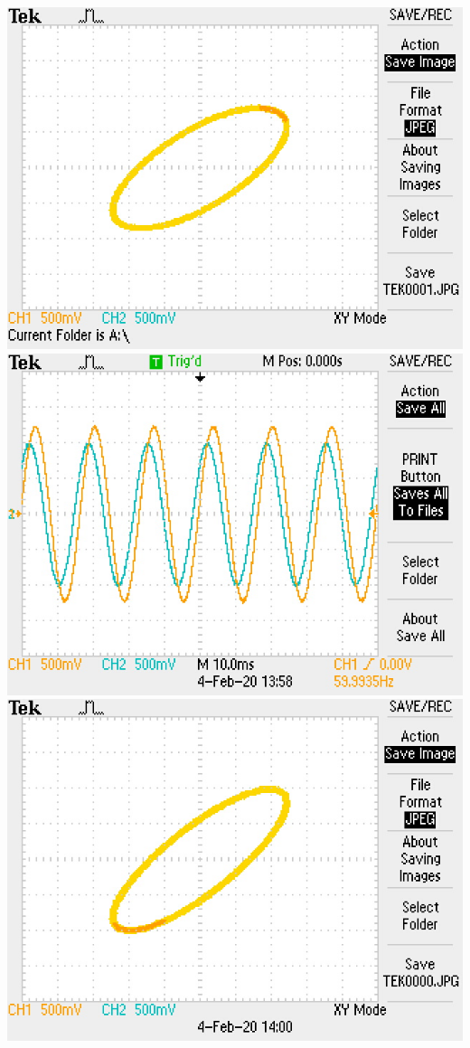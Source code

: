 \includegraphics[width=\textwidth/2]{1-lab/res/4b.JPG}\\
\includegraphics[width=\textwidth/2]{1-lab/res/5a.JPG}
\includegraphics[width=\textwidth/2]{1-lab/res/5b.JPG}

